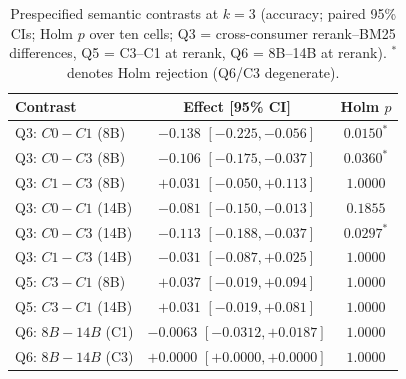\begin{table}[t]
\centering
\caption{Prespecified semantic contrasts at $k=3$ (accuracy; paired 95\% CIs; Holm $p$ over ten cells; Q3 = cross-consumer rerank--BM25 differences, Q5 = C3--C1 at rerank, Q6 = 8B--14B at rerank). $^*$ denotes Holm rejection (Q6/C3 degenerate).}
\label{tab:interaction}
\begin{tabular}{lcc}
\toprule
Contrast & Effect [95\% CI] & Holm $p$ \\
\midrule
Q3: $C0-C1$ (8B) & $-0.138$ $[-0.225,-0.056]$ & $0.0150^*$ \\
Q3: $C0-C3$ (8B) & $-0.106$ $[-0.175,-0.037]$ & $0.0360^*$ \\
Q3: $C1-C3$ (8B) & $+0.031$ $[-0.050,+0.113]$ & $1.0000$ \\
Q3: $C0-C1$ (14B) & $-0.081$ $[-0.150,-0.013]$ & $0.1855$ \\
Q3: $C0-C3$ (14B) & $-0.113$ $[-0.188,-0.037]$ & $0.0297^*$ \\
Q3: $C1-C3$ (14B) & $-0.031$ $[-0.087,+0.025]$ & $1.0000$ \\
Q5: $C3-C1$ (8B) & $+0.037$ $[-0.019,+0.094]$ & $1.0000$ \\
Q5: $C3-C1$ (14B) & $+0.031$ $[-0.019,+0.081]$ & $1.0000$ \\
Q6: $8B-14B$ (C1) & $-0.0063$ $[-0.0312,+0.0187]$ & $1.0000$ \\
Q6: $8B-14B$ (C3) & $+0.0000$ $[+0.0000,+0.0000]$ & $1.0000$ \\
\bottomrule
\end{tabular}
\end{table}
